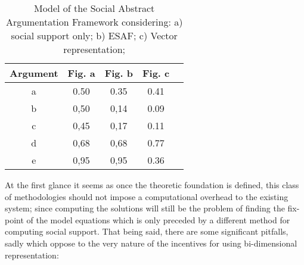 \documentclass{article}
\begin{document}


\renewcommand{\tabcolsep}{0.3cm}
\begin{table}[ht]
  \caption{Model of the Social Abstract Argumentation Framework considering: a) social support only; b) ESAF; c) Vector representation;\\}
  \centering %
\begin{tabular}{c c c c c} %
\hline\hline %
Argument &  Fig. a & Fig. b & Fig. c & \\ [0.7ex] %
\hline %
a & 0.50 & 0.35 & 0.41\\ %
b & 0,50 & 0,14 & 0.09\\
c & 0,45 &  0,17 & 0.11 \\
d & 0,68 & 0,68 & 0.77 \\ 
e & 0,95 & 0,95 & 0.36 \\ [1ex] %
\hline %
\end{tabular}
\label{table:figs} %
\end{table}





At the first glance it seems as once the theoretic foundation is defined, this class of methodologies should not impose a computational overhead to the existing system; since computing the solutions will still be the problem of finding the fix-point of the model equations which is only preceded by a different method for computing social support. 
That being said, there are some significant pitfalls, sadly which oppose to the very nature of the incentives for using bi-dimensional representation:
\end{document}
